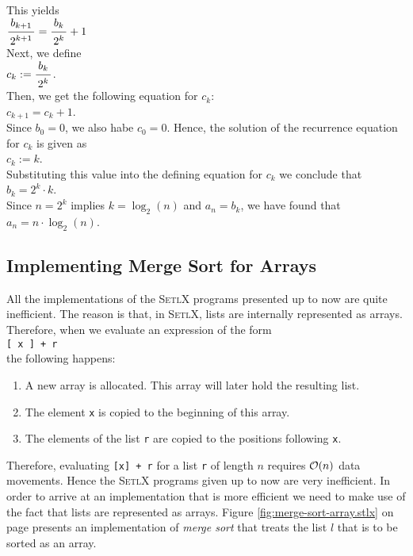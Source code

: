 This yields
\\[0.2cm]
\hspace*{1.3cm}
$\bruch{b_{k+1}}{2^{k+1}} = \bruch{b_k}{2^k} + 1$ 
\\[0.2cm]
Next, we define
\\[0.2cm]
\hspace*{1.3cm}
$c_k := \bruch{b_k}{2^k}$.
\\[0.2cm]
Then, we get the following equation for $c_k$:
\\[0.2cm]
\hspace*{1.3cm}
$c_{k+1} = c_k + 1$.
\\[0.2cm]
Since $b_0 = 0$, we also habe $c_0 = 0$.  Hence, the solution of the recurrence equation for $c_k$
is given as
\\[0.2cm]
\hspace*{1.3cm}
$c_k := k$.
\\[0.2cm]
Substituting this value into the defining equation for $c_k$ we conclude that
\\[0.2cm]
\hspace*{1.3cm}
$b_k = 2^k \cdot k$.
\\[0.2cm]
Since $n = 2^k$ implies $k = \log_2(n)$ and $a_n = b_k$, we have found that
\\[0.2cm]
\hspace*{1.3cm}
$a_n = n \cdot \log_2(n)$. 


\subsection{Implementing Merge Sort for Arrays}
All the implementations of the \textsc{SetlX} programs presented up to now are quite inefficient.  The
reason is that, in \textsc{SetlX}, lists are internally represented as arrays.  Therefore, when
we evaluate an expression of the form 
\\[0.2cm]
\hspace*{1.3cm}
\texttt{[ x ] + r}
\\[0.2cm]
the following happens:
\begin{enumerate}
\item A new array is allocated.  This array will later hold the resulting list.
\item The element \texttt{x} is copied to the beginning of this array.
\item The elements of the list \texttt{r} are copied to the positions following \texttt{x}.
\end{enumerate}
Therefore, evaluating \texttt{[x] + r} for a list \texttt{r} of length $n$ requires $\mathcal{O}(n)$ data
movements.  Hence the \textsc{SetlX} programs given up to now are very inefficient.  In order to arrive at an
implementation that is more efficient we need to make use of the fact that lists are represented as arrays.
Figure \ref{fig:merge-sort-array.stlx} on page \pageref{fig:merge-sort-array.stlx} presents
an implementation of \emph{merge sort} that treats the list $l$ that is to be sorted as an array.


